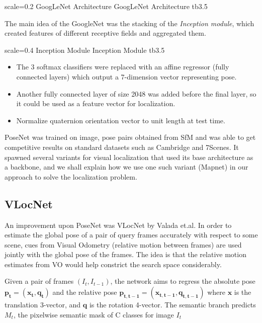 {scale=0.2}%
{GoogLeNet Architecture}%
{GoogLeNet Architecture}%
{tb3.5} %

The main idea of the GoogleNet was the stacking of the \textit{Inception module}, which created features of different receptive fields and aggregated them. 

{scale=0.4}%
{Inception Module}%
{Inception Module}%
{tb3.5} %

\begin{itemize}
	\item The 3 softmax classifiers were replaced with an affine regressor (fully connected layers) which output a 7-dimension vector representing pose.\\
	
	\item Another fully connected layer of size 2048 was added before the final layer, so it could be used as a feature vector for localization. \\
	
	\item Normalize quaternion orientation vector to unit length at test time. \\ 
\end{itemize}

PoseNet was trained on image, pose pairs obtained from SfM and was able to get competitive results on standard datasets such as Cambridge and 7Scenes. It spawned several variants for visual localization that used its base architecture as a backbone, and we shall explain how we use one such variant (Mapnet) in our approach to solve the localization problem. 

\subsection{VLocNet} %
An improvement upon PoseNet was VLocNet by Valada et.al. In order to estimate the global pose of a pair of query frames accurately with respect to some scene, cues from 
Visual Odometry (relative motion between frames) are used jointly with the global pose of the frames. The idea is that the relative motion estimates from VO would help constrict 
the search space considerably. 

Given a pair of frames $(I_t, I_{t-1})$, the network aims to regress the absolute pose $\mathbf{p_t} = \mathbf{(x_t, q_t)}$ and the relative pose 
$\mathbf{p_{t, t-1}} = \mathbf{(x_{t, t-1}, q_{t, t-1})}$ where $\mathbf{x}$ is the translation 3-vector, and $\mathbf{q}$ is the rotation 4-vector. The semantic 
branch predicts $M_t$, the pixelwise semantic mask of C classes for image $I_t$ 

